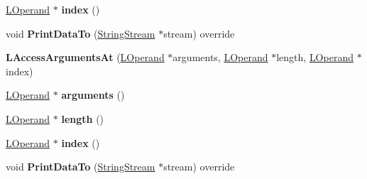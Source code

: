\begin{DoxyCompactItemize}
\item 
\hyperlink{classv8_1_1internal_1_1_l_operand}{L\+Operand} $\ast$ {\bfseries index} ()\hypertarget{classv8_1_1internal_1_1_l_access_arguments_at_a6d772ab178a18a50a3fa64dee0cab4c7}{}\label{classv8_1_1internal_1_1_l_access_arguments_at_a6d772ab178a18a50a3fa64dee0cab4c7}

\item 
void {\bfseries Print\+Data\+To} (\hyperlink{classv8_1_1internal_1_1_string_stream}{String\+Stream} $\ast$stream) override\hypertarget{classv8_1_1internal_1_1_l_access_arguments_at_a3027cb02e655a31d8f9264d10b49c7be}{}\label{classv8_1_1internal_1_1_l_access_arguments_at_a3027cb02e655a31d8f9264d10b49c7be}

\item 
{\bfseries L\+Access\+Arguments\+At} (\hyperlink{classv8_1_1internal_1_1_l_operand}{L\+Operand} $\ast$arguments, \hyperlink{classv8_1_1internal_1_1_l_operand}{L\+Operand} $\ast$length, \hyperlink{classv8_1_1internal_1_1_l_operand}{L\+Operand} $\ast$index)\hypertarget{classv8_1_1internal_1_1_l_access_arguments_at_a8b3a736e564c8f5337bf40bebffae277}{}\label{classv8_1_1internal_1_1_l_access_arguments_at_a8b3a736e564c8f5337bf40bebffae277}

\item 
\hyperlink{classv8_1_1internal_1_1_l_operand}{L\+Operand} $\ast$ {\bfseries arguments} ()\hypertarget{classv8_1_1internal_1_1_l_access_arguments_at_a54eb42639fc35df69b3a3f57d7042ffd}{}\label{classv8_1_1internal_1_1_l_access_arguments_at_a54eb42639fc35df69b3a3f57d7042ffd}

\item 
\hyperlink{classv8_1_1internal_1_1_l_operand}{L\+Operand} $\ast$ {\bfseries length} ()\hypertarget{classv8_1_1internal_1_1_l_access_arguments_at_aca767dd582bd23265453d015e4cb3174}{}\label{classv8_1_1internal_1_1_l_access_arguments_at_aca767dd582bd23265453d015e4cb3174}

\item 
\hyperlink{classv8_1_1internal_1_1_l_operand}{L\+Operand} $\ast$ {\bfseries index} ()\hypertarget{classv8_1_1internal_1_1_l_access_arguments_at_a6d772ab178a18a50a3fa64dee0cab4c7}{}\label{classv8_1_1internal_1_1_l_access_arguments_at_a6d772ab178a18a50a3fa64dee0cab4c7}

\item 
void {\bfseries Print\+Data\+To} (\hyperlink{classv8_1_1internal_1_1_string_stream}{String\+Stream} $\ast$stream) override\hypertarget{classv8_1_1internal_1_1_l_access_arguments_at_a3027cb02e655a31d8f9264d10b49c7be}{}\label{classv8_1_1internal_1_1_l_access_arguments_at_a3027cb02e655a31d8f9264d10b49c7be}


\end{DoxyCompactItemize}
